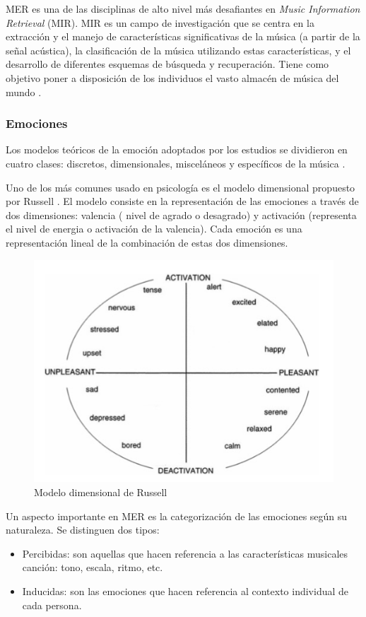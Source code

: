 \documentclass[12pt,a4paper,Spanish]{article}
\begin{document}
MER es una de las disciplinas de alto nivel más desafiantes en \textit{Music Information Retrieval} (MIR). MIR es un campo de investigación que se centra en la extracción y el manejo de características significativas de la música (a partir de la señal acústica), la clasificación de la música utilizando estas características, y el desarrollo de diferentes esquemas de búsqueda y recuperación. Tiene como objetivo poner a disposición de los individuos el vasto almacén de música del mundo \cite{schedl2014music}.

\subsubsection{Emociones}\label{emo}

Los modelos teóricos de la emoción adoptados por los estudios se dividieron en cuatro clases: discretos, dimensionales, misceláneos y específicos de la música \cite{eerola2012review}. 
\newline

Uno de los más comunes usado en psicología es el modelo dimensional propuesto por Russell \cite{posner2005circumplex}. El modelo consiste en la representación de las emociones a través de dos dimensiones: valencia ( nivel de agrado o desagrado) y activación (representa el nivel de energia o activación de la valencia). Cada emoción es una representación lineal de la combinación de estas dos dimensiones.

\begin{figure}[H]
	\centering
	\includegraphics[width=0.7\linewidth]{figs/russell}
	\caption{Modelo dimensional de Russell \cite{posner2005circumplex}}
	\label{fig:russell}
\end{figure}


Un aspecto importante en MER es la categorización de las emociones según su naturaleza. Se distinguen dos tipos:
\begin{itemize}
\item Percibidas: son aquellas que hacen referencia a las características musicales canción: tono, escala, ritmo, etc.
\item Inducidas: son las emociones que hacen referencia al contexto individual de cada persona.
\end{itemize}
\end{document}

